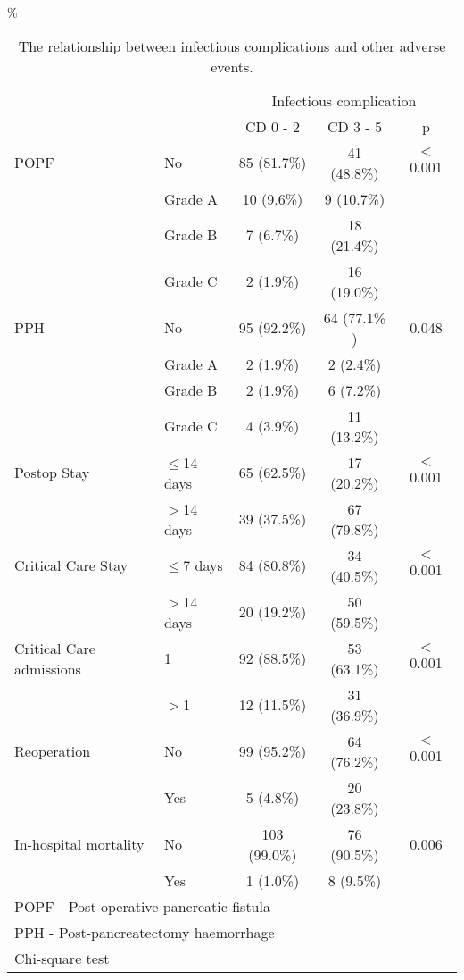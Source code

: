 \begin{table}[p]
	\centering
	\caption{The relationship between infectious complications and other adverse events.}
	\label{table:crp_comp_infect_vs_other_complications}
	\renewcommand{\arraystretch}{1.2} %
	\%\setlength{\tabcolsep}{9pt} %
	\begin{tabular}{|l l | c c c|}
		\hline
		                         &               & \multicolumn{3}{c}{Infectious complication} \\
		                         &               & CD 0 - 2     & CD 3 - 5     & p             \\ \hline
		POPF                     & No            & 85 (81.7\%)  & 41 (48.8\%)  & $<$0.001      \\
		                         & Grade A       & 10 (9.6\%)   & 9 (10.7\%)   &  \\
		                         & Grade B       & 7 (6.7\%)    & 18 (21.4\%)  &  \\
		                         & Grade C       & 2 (1.9\%)    & 16 (19.0\%)  &  \\
		PPH                      & No            & 95 (92.2\%)  & 64 (77.1\% ) & 0.048         \\
		                         & Grade A       & 2 (1.9\%)    & 2 (2.4\%)    &  \\
		                         & Grade B       & 2 (1.9\%)    & 6 (7.2\%)    &  \\
		                         & Grade C       & 4  (3.9\%)   & 11 (13.2\%)  &  \\
		Postop Stay              & $\leq$14 days & 65 (62.5\%)  & 17 (20.2\%)  & $<$0.001      \\
		                         & $>$14 days    & 39 (37.5\%)  & 67 (79.8\%)  &  \\
		Critical Care Stay       & $\leq$7 days  & 84 (80.8\%)  & 34 (40.5\%)  & $<$0.001      \\
		                         & $>$14 days    & 20 (19.2\%)  & 50 (59.5\%)  &  \\
		Critical Care admissions & 1             & 92 (88.5\%)  & 53 (63.1\%)  & $<$0.001      \\
		                         & $>$1          & 12 (11.5\%)  & 31 (36.9\%)  &  \\
		Reoperation              & No            & 99 (95.2\%)  & 64 (76.2\%)  & $<$0.001      \\
		                         & Yes           & 5 (4.8\%)    & 20 (23.8\%)  &  \\
		In-hospital mortality    & No            & 103 (99.0\%) & 76 (90.5\%)  & 0.006         \\
		                         & Yes           & 1 (1.0\%)    & 8 (9.5\%)    &  \\ \hline
		\multicolumn{5}{l}{POPF - Post-operative pancreatic fistula}                           \\
		\multicolumn{5}{l}{PPH - Post-pancreatectomy haemorrhage}                              \\
		\multicolumn{5}{l}{Chi-square test}
	\end{tabular}
\end{table}
